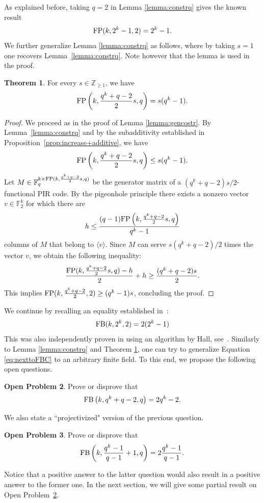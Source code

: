 \documentclass[11pt,a4paper]{article}
\theoremstyle{definition}
\newtheorem{theorem}{Theorem}[section]
\newtheorem{openproblem}[theorem]{Open Problem}
\newcommand{\Z}{\mathbb Z}
\newcommand{\F}{\mathbb F}
\newcommand{\fb}{\textnormal{FB}}
\newcommand{\fp}{\textnormal{FP}}
\begin{document}
As explained before, taking $q=2$ in Lemma \ref{lemma:constrq} gives the known result 
$$\fp(k,2^k-1,2)=2^k-1.$$ We further generalize Lemma \ref{lemma:constrq} as follows, where by taking $s=1$ one recovers Lemma~\ref{lemma:constrq}. Note  however that the lemma is used in the proof.

\begin{theorem}\label{thm:gencostrq}
    For every $s \in \Z_{\ge1}$, we have
    $$\fp\left(k,\frac{q^k+q-2}{2}s,q\right)=s(q^k-1).$$
\end{theorem}
\begin{proof} 
    We proceed as in the proof of Lemma \ref{lemma:gencostr}. By Lemma~\ref{lemma:constrq} and by the subadditivity established in Proposition~\ref{prop:increase+additive}, we have $$\fp\left(k,\frac{q^k+q-2}{2}s,q\right)\leq s(q^k-1).$$
    Let $M\in\F_q^{k\times\fp(k,\frac{q^{k}+q-2}{2}s,q)}$ be the generator matrix of a $(q^k+q-2)s/2$-functional PIR code. By the pigeonhole principle there exists a nonzero vector $v\in \F_2^k$ for which there are 
    $$h\leq\frac{(q-1)\fp\left(k,\frac{q^k+q-2}{2}s,q\right)}{q^k-1}$$
    columns of $M$ that belong to $\langle v\rangle$. Since $M$ can serve $s(q^{k}+q-2)/2$ times the vector $v$, we obtain the following inequality:
    \begin{equation*}
        \frac{\fp(k,\frac{q^k+q-2}{2}s,q)-h}{2}+h\geq \frac{(q^k+q-2)s}{2}.
    \end{equation*}
    This implies $\fp(k,\frac{q^k+q-2}{2},2)\geq (q^k-1)s$, concluding the proof.
\end{proof}

We continue by recalling an equality established in~\cite[Section VI]{yohananov2022almost}:
\begin{equation}
\label{eq:nexttoFBC}
\fb(k,2^k,2)=2(2^k-1)
\end{equation}  This was also independently proven in \cite{hollmann2023some} using an algorithm by Hall, see~\cite{hall1952combinatorial}. Similarly to Lemma \ref{lemma:constrq} and Theorem \ref{thm:gencostrq}, one can try to generalize Equation \eqref{eq:nexttoFBC} to an arbitrary finite field. To this end, we propose the following open questions.

\begin{openproblem}\label{openproblem1}
Prove or disprove that $$\fb\left(k,q^k+q-2,q\right) = 2q^k-2.$$
\end{openproblem}
We also state a ``projectivized" version of the previous question.
\begin{openproblem}
\label{op:projectivebatch}
Prove or disprove that $$\fb\left(k,\frac{q^k-1}{q-1}+1,q\right) = 2\frac{q^k-1}{q-1}.$$
\end{openproblem}
Notice that a positive answer to the latter question would also result in a positive answer to the former one. In the next section, we will give some partial result on Open Problem~\ref{openproblem1}.
\end{document}

